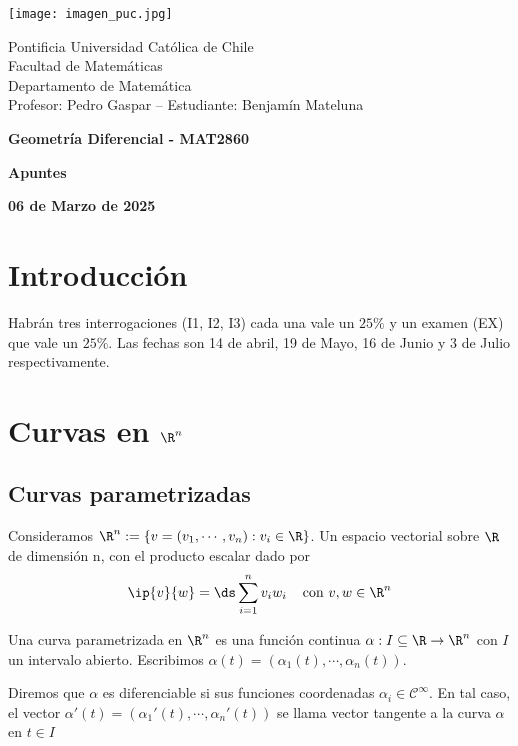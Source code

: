 \documentclass{article}
\begin{document}
\begin{minipage}{2.5cm}
    \texttt{[image: imagen\_puc.jpg]}
\end{minipage}
\begin{minipage}{14cm}
    {\sc Pontificia Universidad Católica de Chile\\
    Facultad de Matemáticas\\
    Departamento de Matemática\\
    Profesor: Pedro Gaspar -- Estudiante: Benjamín Mateluna}
\end{minipage}
\vspace{1ex}

{\centerline{\bf Geometría Diferencial - MAT2860}
\centerline{\bf Apuntes}}
\centerline{\bf 06 de Marzo de 2025}

\newpage
\tableofcontents

\newpage
\section*{Introducción}

Habrán tres interrogaciones (I1, I2, I3) cada una vale un $25\%$ y un examen (EX) que vale un 
$25\%$. Las fechas son 14 de abril, 19 de Mayo, 16 de Junio y 3 de Julio respectivamente.

\newpage
\section{Curvas en \texorpdfstring{$\R^{n}$}{}}
\subsection{Curvas parametrizadas}
\noindent Consideramos $\R^{n}:=\{v=(v_{1},\cdots,v_{n}):v_{i}\in\R\}$. Un espacio vectorial sobre 
$\R$ de dimensión n, con el producto escalar dado por
\begin{equation*}
    \ip{v}{w}=\ds\sum_{i=1}^{n}v_{i}w_{i}\hspace{4mm}\text{con }v,w\in\R^{n}
\end{equation*}

\begin{dfn}
    Una curva parametrizada en $\R^{n}$ es una función continua $\alpha:I\subseteq\R\to\R^{n}$ con 
    $I$ un intervalo abierto. Escribimos $\alpha(t)=(\alpha_{1}(t),\cdots,\alpha_{n}(t))$.
\end{dfn}

\noindent Diremos que $\alpha$ es diferenciable si sus funciones coordenadas 
$\alpha_{i}\in\mathcal{C}^{\infty}$. En tal caso, el vector 
$\alpha'(t)=(\alpha_{1}'(t),\cdots,\alpha_{n}'(t))$ se llama vector tangente a la curva $\alpha$ en
$t\in I$
\end{document}
